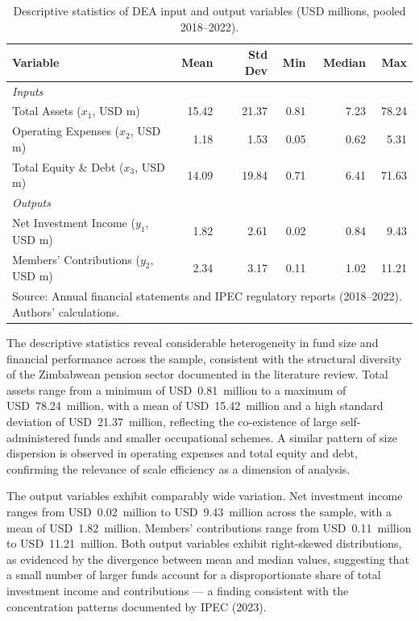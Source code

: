 \documentclass[12pt,a4paper]{article}
\begin{document}
\begin{table}[H]
\centering
\caption{Descriptive statistics of DEA input and output variables (USD millions, pooled 2018--2022).}
\label{tab:descriptive_stats}
\begin{tabular}{lrrrrr}
\toprule
\textbf{Variable} & \textbf{Mean} & \textbf{Std Dev} & \textbf{Min} & \textbf{Median} & \textbf{Max} \\
\midrule
\textit{Inputs} & & & & & \\
Total Assets ($x_1$, USD m)         & 15.42 & 21.37 &  0.81 &  7.23 & 78.24 \\
Operating Expenses ($x_2$, USD m)   &  1.18 &  1.53 &  0.05 &  0.62 &  5.31 \\
Total Equity \& Debt ($x_3$, USD m) & 14.09 & 19.84 &  0.71 &  6.41 & 71.63 \\
\midrule
\textit{Outputs} & & & & & \\
Net Investment Income ($y_1$, USD m)  & 1.82 & 2.61 & 0.02 & 0.84 &  9.43 \\
Members' Contributions ($y_2$, USD m) & 2.34 & 3.17 & 0.11 & 1.02 & 11.21 \\
\bottomrule
\multicolumn{6}{l}{\footnotesize Source: Annual financial statements and IPEC regulatory reports (2018--2022). Authors' calculations.}
\end{tabular}
\end{table}

The descriptive statistics reveal considerable heterogeneity in fund size and financial performance across the sample, consistent with the structural diversity of the Zimbabwean pension sector documented in the literature review. Total assets range from a minimum of USD~0.81~million to a maximum of USD~78.24~million, with a mean of USD~15.42~million and a high standard deviation of USD~21.37~million, reflecting the co-existence of large self-administered funds and smaller occupational schemes. A similar pattern of size dispersion is observed in operating expenses and total equity and debt, confirming the relevance of scale efficiency as a dimension of analysis.

The output variables exhibit comparably wide variation. Net investment income ranges from USD~0.02~million to USD~9.43~million across the sample, with a mean of USD~1.82~million. Members' contributions range from USD~0.11~million to USD~11.21~million. Both output variables exhibit right-skewed distributions, as evidenced by the divergence between mean and median values, suggesting that a small number of larger funds account for a disproportionate share of total investment income and contributions --- a finding consistent with the concentration patterns documented by IPEC (2023).
\end{document}

